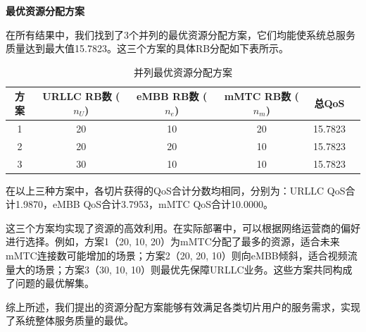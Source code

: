 \textbf{最优资源分配方案}

在所有结果中，我们找到了3个并列的最优资源分配方案，它们均能使系统总服务质量达到最大值15.7823。这三个方案的具体RB分配如下表所示。

\begin{table}[H]
\centering
\caption{并列最优资源分配方案}
\label{tab:q1_best_solutions}
\begin{tabular}{cccccc}
\hline
\textbf{方案} & \textbf{URLLC RB数 ($n_U$)} & \textbf{eMBB RB数 ($n_e$)} & \textbf{mMTC RB数 ($n_m$)} & \textbf{总QoS} \\
\hline
1 & 20 & 10 & 20 & 15.7823 \\
2 & 20 & 20 & 10 & 15.7823 \\
3 & 30 & 10 & 10 & 15.7823 \\
\hline
\end{tabular}
\end{table}

在以上三种方案中，各切片获得的QoS合计分数均相同，分别为：URLLC QoS合计1.9870，eMBB QoS合计3.7953，mMTC QoS合计10.0000。

 这三个方案均实现了资源的高效利用。在实际部署中，可以根据网络运营商的偏好进行选择。例如，方案1（20, 10, 20）为mMTC分配了最多的资源，适合未来mMTC连接数可能增加的场景；方案2（20, 20, 10）则向eMBB倾斜，适合视频流量大的场景；方案3（30, 10, 10）则最优先保障URLLC业务。这些方案共同构成了问题的最优解集。


综上所述，我们提出的资源分配方案能够有效满足各类切片用户的服务需求，实现了系统整体服务质量的最优。